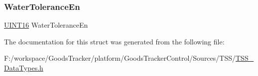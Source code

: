 \subsubsection{\texorpdfstring{Water\+Tolerance\+En}{WaterToleranceEn}}
{\footnotesize\ttfamily \hyperlink{_t_s_s___data_types_8h_a09f1a1fb2293e33483cc8d44aefb1eb1}{U\+I\+N\+T16} Water\+Tolerance\+En}



The documentation for this struct was generated from the following file\+:\begin{DoxyCompactItemize}
\item 
F\+:/workspace/\+Goods\+Tracker/platform/\+Goods\+Tracker\+Control/\+Sources/\+T\+S\+S/\hyperlink{_t_s_s___data_types_8h}{T\+S\+S\+\_\+\+Data\+Types.\+h}\end{DoxyCompactItemize}
